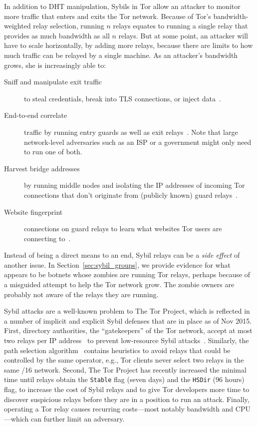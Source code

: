 In addition to DHT manipulation, Sybils in Tor allow an attacker to monitor more
traffic that enters and exits the Tor network.  Because of Tor's
bandwidth-weighted relay selection, running $n$ relays equates to running a
single relay that provides as much bandwidth as all $n$ relays.  But at some
point, an attacker will have to scale horizontally, by adding more relays,
because there are limits to how much traffic can be relayed by a single machine.
As an attacker's bandwidth grows, she is increasingly able to:
\begin{description}
	\item[Sniff and manipulate exit traffic] to steal credentials, break into
		TLS connections, or inject data~\cite{Winter2014a}.
	\item[End-to-end correlate] traffic by running entry guards as well as exit
		relays~\cite{Johnson2013a}.  Note that large network-level adversaries
		such as an ISP or a government might only need to run one of both.
	\item[Harvest bridge addresses] by running middle nodes and isolating the
		IP addresses of incoming Tor connections that don't originate from
		(publicly known) guard relays~\cite{Ling2012a}.
	\item[Website fingerprint] connections on guard relays to learn what
		websites Tor users are connecting to~\cite{Juarez2014a}.
\end{description}

Instead of being a direct means to an end, Sybil relays can be a \emph{side
effect} of another issue.  In Section~\ref{sec:sybil_groups}, we provide
evidence for what appears to be botnets whose zombies are running Tor relays,
perhaps because of a misguided attempt to help the Tor network grow.  The zombie
owners are probably not aware of the relays they are running.

Sybil attacks are a well-known problem to The Tor Project, which is reflected in
a number of implicit and explicit Sybil defenses that are in place as of Nov
2015.  First, directory authorities, the ``gatekeepers'' of the Tor network,
accept at most two relays per IP address~\cite{Bauer2007b} to prevent
low-resource Sybil attacks~\cite{Bauer2007a}.  Similarly, the path selection
algorithm~\cite{path-spec} contains heuristics to avoid relays that could be
controlled by the same operator, e.g., Tor clients never select two relays in
the same /16 network.  Second, The Tor Project has recently increased the
minimal time until relays obtain the \texttt{Stable} flag (seven days) and the
\texttt{HSDir} (96 hours) flag, to increase the cost of Sybil relays and to give
Tor developers more time to discover suspicious relays before they are in a
position to run an attack.  Finally, operating a Tor relay causes recurring
costs---most notably bandwidth and CPU---which can further limit an adversary.

